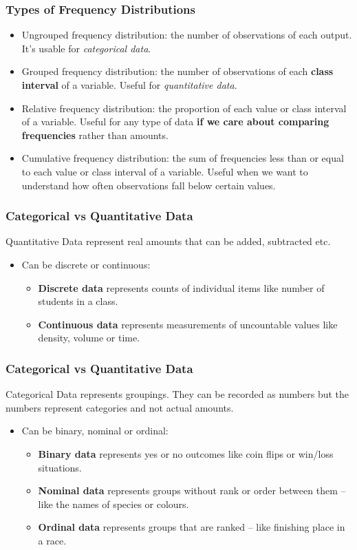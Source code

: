 \documentclass[aspectratio=169,11pt,svgnames]{beamer}
\begin{document}
\begin{frame}
 \frametitle{Types of Frequency Distributions}
 \begin{itemize}[label=\textbullet]
  \item \alert{Ungrouped frequency distribution}: the number of observations of
   each output. It's usable for \emph{categorical data}.
  \pause
  \item \alert{Grouped frequency distribution}: the number of observations of
   each \textbf{class interval} of a variable. Useful for \emph{quantitative
   data}.
  \pause
  \item \alert{Relative frequency distribution}: the proportion of each value or
   class interval of a variable. Useful for any type of data \textbf{if we care
   about comparing frequencies} rather than amounts.
  \pause
  \item \alert{Cumulative frequency distribution}: the sum of frequencies less
   than or equal to each value or class interval of a variable. Useful when we
   want to understand how often observations fall below certain values.
 \end{itemize}
\end{frame}

\begin{frame}
 \frametitle{Categorical vs Quantitative Data}
 \alert{Quantitative Data} represent real amounts that can be added, subtracted
 etc.
 \pause
 \begin{itemize}[label=\textbullet]
  \item Can be discrete or continuous:
  \pause
  \begin{itemize}[label=$\circ$]
   \item \textbf{Discrete data} represents counts of individual items like number of
    students in a class.
   \pause
   \item \textbf{Continuous data} represents measurements of uncountable values like
    density, volume or time.
  \end{itemize}
 \end{itemize}
\end{frame}

\begin{frame}
 \frametitle{Categorical vs Quantitative Data}
 \alert{Categorical Data} represents groupings. They can be recorded as numbers
 but the numbers represent categories and not actual amounts.
 \pause
 \begin{itemize}[label=\textbullet]
  \item Can be binary, nominal or ordinal:
  \pause
  \begin{itemize}[label=$\circ$]
   \item \textbf{Binary data} represents yes or no outcomes like coin flips or
    win/loss situations.
   \pause
   \item \textbf{Nominal data} represents groups without rank or order between
    them -- like the names of species or colours.
   \pause
   \item \textbf{Ordinal data} represents groups that are ranked -- like
    finishing place in a race.
  \end{itemize}
 \end{itemize}
\end{frame}
\end{document}
